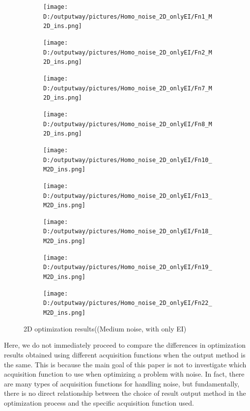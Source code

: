 \documentclass{article}
\begin{document}
\begin{figure}[H]
    \centering
    \begin{subfigure}[t]{.32\linewidth}
        \centering
        \texttt{[image: D:/outputway/pictures/Homo\_noise\_2D\_onlyEI/Fn1\_M2D\_ins.png]}
    \end{subfigure}
    \begin{subfigure}[t]{.32\linewidth}
        \centering
        \texttt{[image: D:/outputway/pictures/Homo\_noise\_2D\_onlyEI/Fn2\_M2D\_ins.png]}
    \end{subfigure}
    \begin{subfigure}[t]{.32\linewidth}
        \centering
        \texttt{[image: D:/outputway/pictures/Homo\_noise\_2D\_onlyEI/Fn7\_M2D\_ins.png]}
    \end{subfigure}
    \begin{subfigure}[t]{.32\linewidth}
        \centering
        \texttt{[image: D:/outputway/pictures/Homo\_noise\_2D\_onlyEI/Fn8\_M2D\_ins.png]}
    \end{subfigure}
    \begin{subfigure}[t]{.32\linewidth}
        \centering
        \texttt{[image: D:/outputway/pictures/Homo\_noise\_2D\_onlyEI/Fn10\_M2D\_ins.png]}
    \end{subfigure}
    \begin{subfigure}[t]{.32\linewidth}
        \centering
        \texttt{[image: D:/outputway/pictures/Homo\_noise\_2D\_onlyEI/Fn13\_M2D\_ins.png]}
    \end{subfigure}
    \begin{subfigure}[t]{.32\linewidth}
        \centering
        \texttt{[image: D:/outputway/pictures/Homo\_noise\_2D\_onlyEI/Fn18\_M2D\_ins.png]}
    \end{subfigure}
    \begin{subfigure}[t]{.32\linewidth}
        \centering
        \texttt{[image: D:/outputway/pictures/Homo\_noise\_2D\_onlyEI/Fn19\_M2D\_ins.png]}
    \end{subfigure}
    \begin{subfigure}[t]{.32\linewidth}
        \centering
        \texttt{[image: D:/outputway/pictures/Homo\_noise\_2D\_onlyEI/Fn22\_M2D\_ins.png]}
    \end{subfigure}
    \caption{2D optimization results((Medium noise, with only EI)}
    \label{Fig9}
\end{figure}

\hspace{2em}Here, we do not immediately proceed to compare the differences in optimization results obtained using different acquisition functions when the output method is the same. This is because the main goal of this paper is not to investigate which acquisition function to use when optimizing a problem with noise. In fact, there are many types of acquisition functions for handling noise, but fundamentally, there is no direct relationship between the choice of result output method in the optimization process and the specific acquisition function used.
\end{document}
